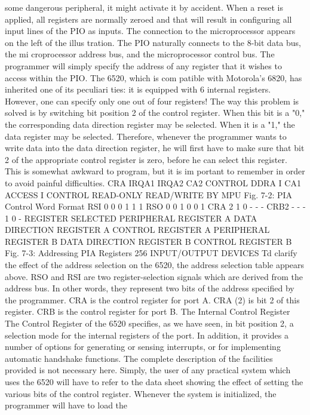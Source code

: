 \documentclass{book}
\begin{document}
some dangerous peripheral, it might activate it by accident.
When a reset is applied, all registers are normally zeroed and that
will result in configuring all input lines of the PIO as inputs. The
connection to the microprocessor appears on the left of the illus
tration. The PIO naturally connects to the 8-bit data bus, the mi
croprocessor address bus, and the microprocessor control bus.
The programmer will simply specify the address of any register
that it wishes to access within the PIO. The 6520, which is com
patible with Motorola's 6820, has inherited one of its peculiari
ties: it is equipped with 6 internal registers. However, one can
specify only one out of four registers! The way this problem is
solved is by switching bit position 2 of the control register. When
this bit is a "0," the corresponding data direction register may be
selected. When it is a "1," the data register may be selected.
Therefore, whenever the programmer wants to write data into the
data direction register, he will first have to make sure that bit 2
of the appropriate control register is zero, before he can select
this register. This is somewhat awkward to program, but it is im
portant to remember in order to avoid painful difficulties.
CRA IRQA1 IRQA2 CA2 CONTROL
DDRA I CA1
ACCESS I CONTROL
READ-ONLY READ/WRITE BY MPU
Fig. 7-2: PIA Control Word Format
RSI
0
0
0
1
1
1
RSO
0
0
1
0
0
1
CRA 2
1
0
-
-
-
CRB2
-
-
-
1
0
-
REGISTER SELECTED
PERIPHERAL REGISTER A
DATA DIRECTION REGISTER A
CONTROL REGISTER A
PERIPHERAL REGISTER B
DATA DIRECTION REGISTER B
CONTROL REGISTER B
Fig. 7-3: Addressing PIA Registers
256
INPUT/OUTPUT DEVICES
Td clarify the effect of the address selection on the 6520, the
address selection table appears above. RSO and RSI are two
register-selection signals which are derived from the address bus.
In other words, they represent two bits of the address specified by
the programmer. CRA is the control register for port A. CRA (2)
is bit 2 of this register. CRB is the control register for port B.
The Internal Control Register
The Control Register of the 6520 specifies, as we have seen, in
bit position 2, a selection mode for the internal registers of the
port. In addition, it provides a number of options for generating or
sensing interrupts, or for implementing automatic handshake
functions. The complete description of the facilities provided is
not necessary here. Simply, the user of any practical system which
uses the 6520 will have to refer to the data sheet showing the
effect of setting the various bits of the control register. Whenever
the system is initialized, the programmer will have to load the
\end{document}
